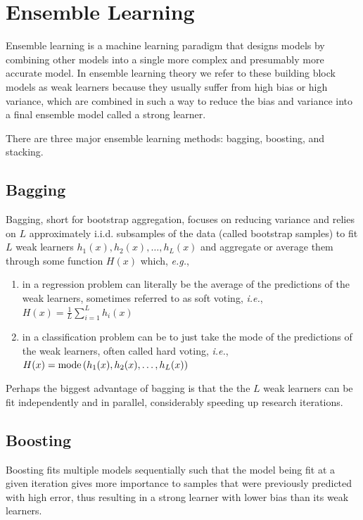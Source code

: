 \section{Ensemble Learning}

Ensemble learning is a machine learning paradigm that designs models by combining other models into a single more complex and presumably more accurate model. In ensemble learning theory we refer to these building block models as weak learners because they usually suffer from high bias or high variance, which are combined in such a way to reduce the bias and variance into a final ensemble model called a strong learner.

There are three major ensemble learning methods: bagging, boosting, and stacking.

\subsection{Bagging}

Bagging, short for bootstrap aggregation, focuses on reducing variance and relies on $L$ approximately i.i.d. subsamples of the data (called bootstrap samples) to fit $L$ weak learners $h_1(x), h_2(x), \ldots, h_L(x)$ and aggregate or average them through some function $H(x)$ which, \textit{e.g.},

\begin{enumerate}
    \item in a regression problem can literally be the average of the predictions of the weak learners, sometimes referred to as soft voting, \textit{i.e.}, $H(x) = \frac{1}{L} \sum_{i=1}^{L} h_i(x)$
    \item in a classification problem can be to just take the mode of the predictions of the weak learners, often called hard voting, \textit{i.e.}, $H(x) = \operatorname*{mode}{(h_1(x), h_2(x), \ldots, h_L(x))}$
\end{enumerate}

Perhaps the biggest advantage of bagging is that the the $L$ weak learners can be fit independently and in parallel, considerably speeding up research iterations.

\subsection{Boosting}

Boosting fits multiple models sequentially such that the model being fit at a given iteration gives more importance to samples that were previously predicted with high error, thus resulting in a strong learner with lower bias than its weak learners.

